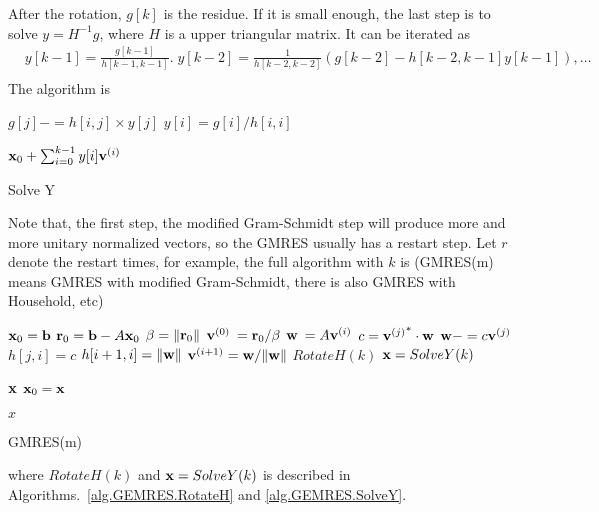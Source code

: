 After the rotation, $g[k]$ is the residue. If it is small enough, the last step is to solve $y=H^{-1}g$, where $H$ is a upper triangular matrix. It can be iterated as
\begin{equation}
\begin{split}
&y[k-1]=\frac{g[k-1]}{h[k-1,k-1]}.\;y[k-2]=\frac{1}{h[k-2,k-2]}\left(g[k-2]-h[k-2,k-1]y[k-1]\right),\ldots\\
\end{split}
\end{equation}
The algorithm is
\begin{algorithm}[H]
\begin{algorithmic}
        \State $g[j]-=h[i,j]\times y[j]$
    \EndFor
    \State $y[i] = g[i] / h[i,i]$
\EndFor

\Return ${\bf x}_0+\sum _{i=0}^{k-1}y[i]{\bf v}^{(i)}$
\end{algorithmic}
\caption{\label{alg.GEMRES.SolveY}Solve Y}
\end{algorithm}

Note that, the first step, the modified Gram-Schmidt step will produce more and more unitary normalized vectors, so the GMRES usually has a restart step. Let $r$ denote the restart times, for example, the full algorithm with $k$ is (GMRES(m) means GMRES with modified Gram-Schmidt, there is also GMRES with Household, etc)
\begin{algorithm}[H]
\begin{algorithmic}
\State ${\bf x}_0={\bf b}$
    \State ${\bf r}_0={\bf b}-A{\bf x}_0$
    \State $\beta = \|{\bf r}_0\|$
    \State ${\bf v}^{(0)}\:={\bf r}_0/\beta$
        \State ${\bf w}\:=A{\bf v}^{(i)}$
            \State $c={{\bf v}^{(j)}}^*\cdot {\bf w}$
            \State ${\bf w}-=c{\bf v}^{(j)}$
            \State $h[j,i]=c$
        \EndFor
        \State $h[i+1,i]=\|{\bf w}\|$
        \State ${\bf v}^{(i+1)}={\bf w}/\|{\bf w}\|$
    \EndFor
    \State $RotateH(k)$
    \State ${\bf x}=SolveY(k)$

        \Return ${\bf x}$
    \EndIf
    \State ${\bf x}_0={\bf x}$
\EndFor

\Return $x$
\end{algorithmic}
\caption{GMRES(m)}
\end{algorithm}
where $RotateH(k)$ and ${\bf x}=SolveY(k)$ is described in Algorithms.~\ref{alg.GEMRES.RotateH} and \ref{alg.GEMRES.SolveY}.
